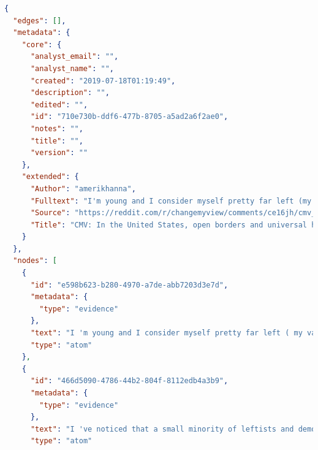 \documentclass[12pt,a4paper]{article}
\begin{document}
\begin{lstlisting}[language=json,firstnumber=1]
    {
  "edges": [], 
  "metadata": {
    "core": {
      "analyst_email": "", 
      "analyst_name": "", 
      "created": "2019-07-18T01:19:49", 
      "description": "", 
      "edited": "", 
      "id": "710e730b-ddf6-477b-8705-a5ad2a6f2ae0", 
      "notes": "", 
      "title": "", 
      "version": ""
    }, 
    "extended": {
      "Author": "amerikhanna", 
      "Fulltext": "I'm young and I consider myself pretty far left (my values align pretty closely with Warren, Sanders, AOC). I've noticed that a small minority of leftists and democratic socialists advocate for open borders while also arguing that universal healthcare should be a priority in the Democratic Party. \n\nI firmly believe basic healthcare is a human right that should be provided by the government to all people regardless of immigration status. I want to believe in open borders because I see how borders have turned entire countries and regions into war zones (not only in the American southwest but in India/Pakistan, Israel/Palestine, etc)....However, I can't help but feel that if we had both universal healthcare and open borders, we would create a 'drain' in which people could come over from other countries, obtain free healthcare, and leave without making enough of a contribution to the American economy to sustain the system. \n\nOne answer would be to have universal healthcare only for Americans or people residing in America. However, then we get in the business of denying healthcare based on immigration status which is morally wrong. I can't support the idea that some people are more entitled to life-saving care than others based on a piece of documentation.", 
      "Source": "https://reddit.com/r/changemyview/comments/ce16jh/cmv_in_the_united_states_open_borders_and/", 
      "Title": "CMV: In the United States, open borders and universal healthcare are contradictory goals"
    }
  }, 
  "nodes": [
    {
      "id": "e598b623-b280-4970-a7de-abb7203d3e7d", 
      "metadata": {
        "type": "evidence"
      }, 
      "text": "I 'm young and I consider myself pretty far left ( my values align pretty closely with Warren , Sanders , AOC ) .", 
      "type": "atom"
    }, 
    {
      "id": "466d5090-4786-44b2-804f-8112edb4a3b9", 
      "metadata": {
        "type": "evidence"
      }, 
      "text": "I 've noticed that a small minority of leftists and democratic socialists advocate for open borders while also arguing that universal healthcare should be a priority in the Democratic Party .", 
      "type": "atom"

\end{lstlisting}
\end{document}
